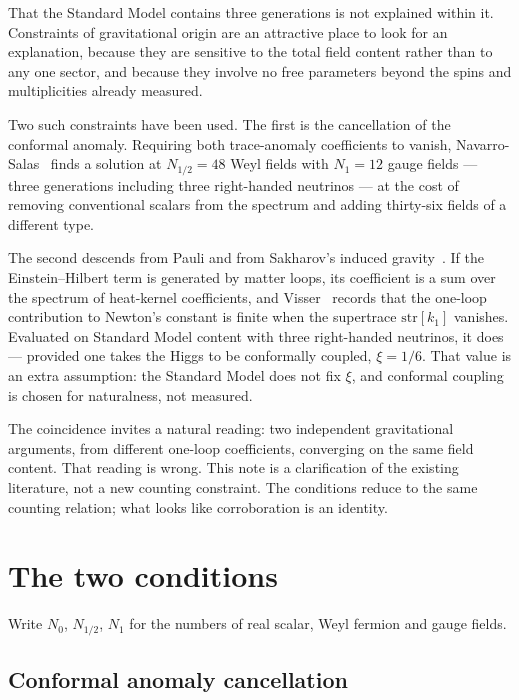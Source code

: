 \documentclass[aps,prd,twocolumn,superscriptaddress,nofootinbib,10pt]{revtex4-2}
\begin{document}
That the Standard Model contains three generations is not explained within it. Constraints of
gravitational origin are an attractive place to look for an explanation, because they are sensitive
to the total field content rather than to any one sector, and because they involve no free
parameters beyond the spins and multiplicities already measured.

Two such constraints have been used. The first is the cancellation of the conformal
anomaly. Requiring both trace-anomaly coefficients to vanish, Navarro-Salas~\cite{NavarroSalas2024}
finds a solution at $N_{1/2} = 48$ Weyl fields with $N_1 = 12$ gauge fields --- three generations
including three right-handed neutrinos --- at the cost of removing conventional scalars from the
spectrum and adding thirty-six fields of a different type.

The second descends from Pauli and from Sakharov's induced gravity~\cite{Sakharov1967}. If the
Einstein--Hilbert term is generated by matter loops, its coefficient is a sum over the spectrum of
heat-kernel coefficients, and Visser~\cite{Visser2002} records that the one-loop contribution to
Newton's constant is finite when the supertrace $\mathrm{str}[k_1]$ vanishes. Evaluated on Standard
Model content with three right-handed neutrinos, it does --- provided one takes the Higgs to be
conformally coupled, $\xi = 1/6$. That value is an extra assumption: the Standard Model does not
fix $\xi$, and conformal coupling is chosen for naturalness, not measured.

The coincidence invites a natural reading: two independent gravitational arguments, from different
one-loop coefficients, converging on the same field content. That reading is wrong. This note is a
clarification of the existing literature, not a new counting constraint. The conditions reduce to
the same counting relation; what looks like corroboration is an identity.

\section{The two conditions}\label{sec:conditions}

Write $N_0$, $N_{1/2}$, $N_1$ for the numbers of real scalar, Weyl fermion and gauge fields.

\subsection{Conformal anomaly cancellation}
\end{document}
